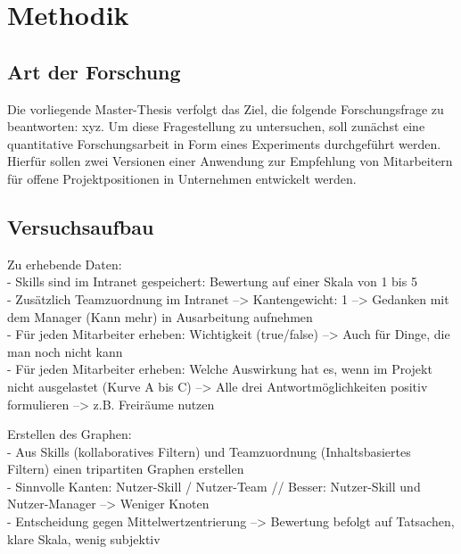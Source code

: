 \chapter{Methodik}
\label{ch:methodik}

\section{Art der Forschung}
\label{ch:methodik:art}
Die vorliegende Master-Thesis verfolgt das Ziel, die folgende Forschungsfrage zu beantworten: xyz. Um diese Fragestellung zu untersuchen, soll zunächst eine quantitative Forschungsarbeit in Form eines Experiments durchgeführt werden. Hierfür sollen zwei Versionen einer Anwendung zur Empfehlung von Mitarbeitern für offene Projektpositionen in Unternehmen entwickelt werden.

\section{Versuchsaufbau}
\label{ch:methodik:versuchsaufbau}
Zu erhebende Daten:\\
- Skills sind im Intranet gespeichert: Bewertung auf einer Skala von 1 bis 5\\
- Zusätzlich Teamzuordnung im Intranet --> Kantengewicht: 1 --> Gedanken mit dem Manager (Kann mehr) in Ausarbeitung aufnehmen\\
- Für jeden Mitarbeiter erheben: Wichtigkeit (true/false) --> Auch für Dinge, die man noch nicht kann\\
- Für jeden Mitarbeiter erheben: Welche Auswirkung hat es, wenn im Projekt nicht ausgelastet (Kurve A bis C) --> Alle drei Antwortmöglichkeiten positiv formulieren --> z.B. Freiräume nutzen

Erstellen des Graphen:\\
- Aus Skills (kollaboratives Filtern) und Teamzuordnung (Inhaltsbasiertes Filtern) einen tripartiten Graphen erstellen\\
- Sinnvolle Kanten: Nutzer-Skill / Nutzer-Team // Besser: Nutzer-Skill und Nutzer-Manager --> Weniger Knoten\\
- Entscheidung gegen Mittelwertzentrierung --> Bewertung befolgt auf Tatsachen, klare Skala, wenig subjektiv

